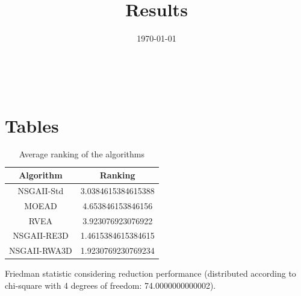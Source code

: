 \documentclass{article}
\title{Results}
\author{}
\date{\today}
\begin{document}
\oddsidemargin 0in \topmargin 0in\maketitle
\
\section{Tables}
\begin{table}[!htp]
\centering
\caption{Average ranking of the algorithms}
\begin{tabular}{c|c}
Algorithm&Ranking\\
\hline
NSGAII-Std&3.0384615384615388\\
MOEAD&4.653846153846156\\
RVEA&3.923076923076922\\
NSGAII-RE3D&1.4615384615384615\\
NSGAII-RWA3D&1.9230769230769234\\
\end{tabular}
\end{table}


Friedman statistic considering reduction performance (distributed according to chi-square with 4 degrees of freedom: 74.0000000000002).
\end{document}

